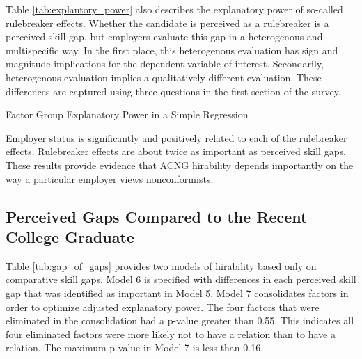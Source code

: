 \documentclass[review]{elsarticle}
\begin{document}
Table \ref{tab:explantory_power} also describes the explanatory power of so-called rulebreaker effects.
Whether the candidate is perceived as a rulebreaker is a perceived skill gap, but employers evaluate this gap in a heterogenous and multispecific way.
In the first place, this heterogenous evaluation has sign and magnitude implications for the dependent variable of interest.
Secondarily, heterogenous evaluation implies a qualitatively different evaluation.
These differences are captured using three questions in the first section of the survey.

\begin{table}
    \caption{Factor Group Explanatory Power in a Simple Regression}
    \resizebox{\columnwidth}{!}{
        
    }
    \label{tab:explantory_power}
\end{table}

Employer status is significantly and positively related to each of the rulebreaker effects.
Rulebreaker effects are about twice as important as perceived skill gaps.
These results provide evidence that ACNG hirability depends importantly on the way a particular employer views nonconformists.

\subsection{Perceived Gaps Compared to the Recent College Graduate}

Table \ref{tab:gap_of_gaps} provides two models of hirability based only on comparative skill gaps.
Model 6 is specified with differences in each perceived skill gap that was identified as important in Model 5.
Model 7 consolidates factors in order to optimize adjusted explanatory power.
The four factors that were eliminated in the consolidation had a p-value greater than 0.55.
This indicates all four eliminated factors were more likely not to have a relation than to have a relation.
The maximum p-value in Model 7 is less than 0.16.
\end{document}

